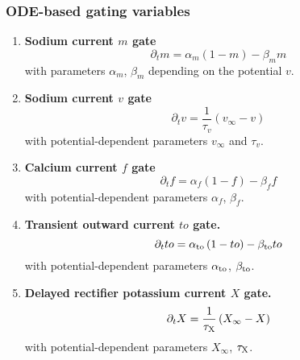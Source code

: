 \documentclass{scrartcl}
\begin{document}
\subsubsection{ODE-based gating variables}
\begin{enumerate}
\item {\bf Sodium current $m$ gate}
\begin{equation}
	\partial_t m = \alpha_m \left(1 - m \right) - \beta_m m
\end{equation}
with parameters $\alpha_m$, $\beta_m$ depending on the potential $v$.
\item {\bf Sodium current $v$ gate}
\begin{equation}
	\partial_t v = \frac{1}{\tau_v} \left( v_{\infty} - v \right)
\end{equation}
with potential-dependent parameters $v_{\infty}$ and $\tau_v$.
\item {\bf Calcium current $f$ gate}
\begin{equation}
	\partial_t f = \alpha_f \left( 1 - f \right)  - \beta_f f
\end{equation}
with potential-dependent parameters $\alpha_f$, $\beta_f$.
\item {\bf Transient outward current $to$ gate.}
\begin{equation}
	\partial_t to = \alpha_{\rm to} \left(1 - to \right) - \beta_{\rm to} to
\end{equation}
with potential-dependent parameters $\alpha_{\rm to}$, $\beta_{\rm to}$.
\item {\bf Delayed rectifier potassium current $X$ gate.}
\begin{equation}
	\partial_t X = \frac{1}{\tau_{\rm X}} \left( X_{\infty} - X \right)
\end{equation}
with potential-dependent parameters $X_{\infty}$, $\tau_{\rm X}$.
\end{enumerate}
%
%
\end{document}
